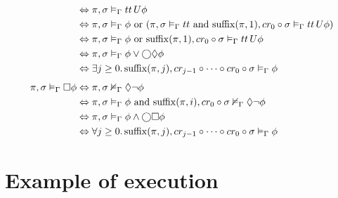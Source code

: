 \begin{align}
    &\Leftrightarrow {\pi}, {\sigma} \vDash_{\Gamma} {{tt}\,U {\phi}} \notag \\
    &\Leftrightarrow {\pi}, {\sigma} \vDash_{\Gamma} {\phi} \text{ or }
        ({\pi}, {\sigma} \vDash_{\Gamma} {tt} \text { and } {\operatorname{suffix}(\pi,1)}, {cr_0 \circ \sigma} \vDash_{\Gamma} {{tt}\,U {\phi}}) \notag \\
    &\Leftrightarrow {\pi}, {\sigma} \vDash_{\Gamma} {\phi} \text{ or }
        {\operatorname{suffix}(\pi,1)}, {cr_0 \circ \sigma} \vDash_{\Gamma} {{tt}\,U {\phi}} \notag \\
    &\Leftrightarrow {\pi}, {\sigma} \vDash_{\Gamma} {\phi} \lor \bigcirc{\Diamond{\phi}} \label{eq:eventuallyexp} \\
    &\Leftrightarrow \exists {j \geq 0} \ldotp {{\operatorname{suffix}(\pi,j)}, {cr_{j-1} \circ \cdots \circ cr_0 \circ \sigma} \vDash_{\Gamma} {\phi}} \label{eq:eventuallysem} \\[1ex]
  {\pi}, {\sigma} \vDash_{\Gamma} {\Box{\phi}}
    &\Leftrightarrow {\pi}, {\sigma} \nvDash_{\Gamma} {\Diamond{\neg\phi}} \notag \\
    &\Leftrightarrow {\pi}, {\sigma} \vDash_{\Gamma} {\phi} \text{ and }
        {\operatorname{suffix}(\pi,i)}, {cr_0 \circ \sigma} \nvDash_{\Gamma} {\Diamond{\neg\phi}} \notag \\
    &\Leftrightarrow {\pi}, {\sigma} \vDash_{\Gamma} {\phi \land \bigcirc{\Box{\phi}}} \label{eq:foreverexp} \\
    &\Leftrightarrow \forall {j \geq 0} \ldotp {{\operatorname{suffix}(\pi,j)}, {cr_{j-1} \circ \cdots \circ cr_0 \circ \sigma} \vDash_{\Gamma} {\phi}} \label{eq:foreversem}
\end{align}

\section{Example of execution}

